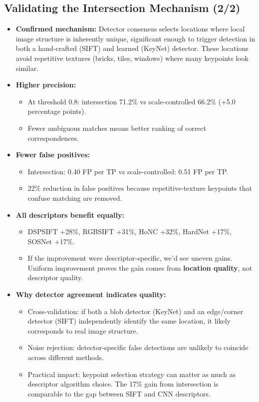 \documentclass[11pt, letterpaper]{article}
\begin{document}
\subsection{Validating the Intersection Mechanism (2/2)}
\begin{itemize}
  \item \textbf{Confirmed mechanism:} Detector consensus selects locations where local image structure is inherently unique, significant enough to trigger detection in both a hand-crafted (SIFT) and learned (KeyNet) detector. These locations avoid repetitive textures (bricks, tiles, windows) where many keypoints look similar.
  \item \textbf{Higher precision:}
    \begin{itemize}
      \item At threshold 0.8: intersection 71.2\% vs scale-controlled 66.2\% (+5.0 percentage points).
      \item Fewer ambiguous matches means better ranking of correct correspondences.
    \end{itemize}
  \item \textbf{Fewer false positives:}
    \begin{itemize}
      \item Intersection: 0.40 FP per TP vs scale-controlled: 0.51 FP per TP.
      \item 22\% reduction in false positives because repetitive-texture keypoints that confuse matching are removed.
    \end{itemize}
  \item \textbf{All descriptors benefit equally:}
    \begin{itemize}
      \item DSPSIFT +28\%, RGBSIFT +31\%, HoNC +32\%, HardNet +17\%, SOSNet +17\%.
      \item If the improvement were descriptor-specific, we'd see uneven gains. Uniform improvement proves the gain comes from \textbf{location quality}, not descriptor quality.
    \end{itemize}
  \item \textbf{Why detector agreement indicates quality:}
    \begin{itemize}
      \item Cross-validation: if both a blob detector (KeyNet) and an edge/corner detector (SIFT) independently identify the same location, it likely corresponds to real image structure.
      \item Noise rejection: detector-specific false detections are unlikely to coincide across different methods.
      \item Practical impact: keypoint selection strategy can matter as much as descriptor algorithm choice. The 17\% gain from intersection is comparable to the gap between SIFT and CNN descriptors.
    \end{itemize}
\end{itemize}
\end{document}
